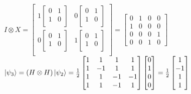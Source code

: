 \documentclass{iansnotes}
\begin{document}
$I \otimes X = \begin{bmatrix}
  1 \begin{bmatrix} 0 & 1 \\ 1 & 0 \\ \end{bmatrix} & 0 \begin{bmatrix} 0 & 1 \\ 1 & 0 \\ \end{bmatrix} \\[5mm]
  0 \begin{bmatrix} 0 & 1 \\ 1 & 0 \\ \end{bmatrix} & 1 \begin{bmatrix} 0 & 1 \\ 1 & 0 \\ \end{bmatrix} \\
\end{bmatrix} = \begin{bmatrix} 0 & 1 & 0 & 0 \\ 1 & 0 & 0 & 0 \\ 0 & 0 & 0 & 1 \\ 0 & 0 & 1 & 0 \end{bmatrix}$ \\[16mm]
$\ket{\psi_3} = (H \otimes H) \ket{\psi_2} = \frac{1}{2} \begin{bmatrix} 1 & 1 & 1 & 1 \\ 1 & -1 & 1 & 1 \\ 1 & 1 & -1 & -1 \\ 1 & 1 & -1 & 1 \end{bmatrix} \begin{bmatrix} 0 \\ 1 \\ 0 \\ 0 \end{bmatrix} = \frac{1}{2}\begin{bmatrix} 1 \\ -1 \\ 1 \\ 1 \end{bmatrix}$ \\[16mm]
\end{document}
